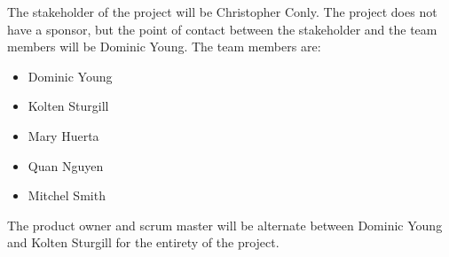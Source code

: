 The stakeholder of the project will be Christopher Conly. The project does not have a sponsor, but the point of contact between the stakeholder and the team members will be Dominic Young. The team members are:

\begin{itemize}
  \item Dominic Young
  \item Kolten Sturgill
  \item Mary Huerta
  \item Quan Nguyen
  \item Mitchel Smith
\end{itemize}

The product owner and scrum master will be alternate between Dominic Young and Kolten Sturgill for the entirety of the project.

